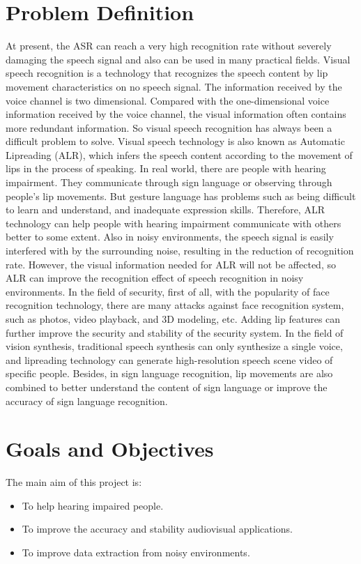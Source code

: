        
        \section{Problem Definition}
        At present, the ASR can reach a very high recognition rate without severely damaging the speech signal and also can be used in many practical fields. Visual speech recognition is a technology that recognizes the speech content by lip movement characteristics on no speech signal. The information received by the voice channel is two dimensional. Compared with the one-dimensional voice information received by the voice channel, the visual information often contains more redundant information. So visual speech recognition has always been a difficult problem to solve. Visual speech technology is also known as Automatic Lipreading (ALR), which infers the speech content according to the movement of lips in the process of speaking. In real world, there are people with hearing impairment. They communicate through sign language or observing through people’s lip movements. But gesture language has problems such as being difficult to learn and understand, and inadequate expression skills. Therefore, ALR technology can help people with hearing impairment communicate with others better to some extent. Also in noisy environments, the speech signal is easily interfered with by the surrounding noise, resulting in the reduction of recognition rate. However, the visual information needed for ALR will not be affected, so ALR can improve the recognition effect of speech recognition in noisy environments. In the field of security, first of all, with the popularity of face recognition technology, there are many attacks against face recognition system, such as photos, video playback, and 3D modeling, etc. Adding lip features can further improve the security and stability of the security system. In the field of vision synthesis, traditional speech synthesis can only synthesize a single voice, and lipreading technology can generate high-resolution speech scene video of specific people. Besides, in sign language recognition, lip movements are also combined to better understand the content of sign language or improve the accuracy of sign language recognition.
        \section{Goals and Objectives}
        The main aim of this project is:
\begin{itemize}
	\item To help hearing impaired people.
	\item To improve the accuracy and stability audiovisual applications. 
	\item To improve data extraction from noisy environments.
\end{itemize}	
       